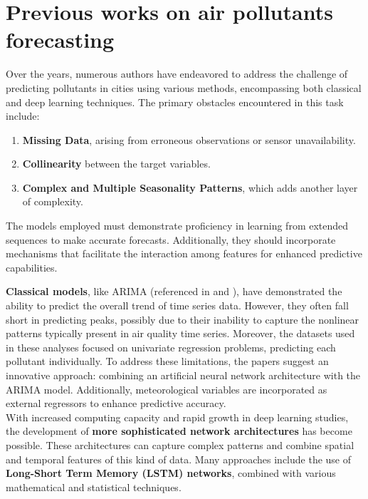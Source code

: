 \section{Previous works on air pollutants forecasting}
\label{cap1:sota}
Over the years, numerous authors have endeavored to address the challenge of predicting pollutants in cities using various methods, encompassing both classical and deep learning techniques. The primary obstacles encountered in this task include:

\begin{enumerate}
  \item \textbf{Missing Data}, arising from erroneous observations or sensor unavailability.
  \item \textbf{Collinearity} between the target variables.
  \item \textbf{Complex and Multiple Seasonality Patterns}, which adds another layer of complexity.
\end{enumerate}

The models employed must demonstrate proficiency in learning from extended sequences to make accurate forecasts. Additionally, they should incorporate mechanisms that facilitate the interaction among features for enhanced predictive capabilities.

\textbf{Classical models}, like ARIMA (referenced in \cite{DIAZROBLES20088331} and \cite{Jodar2013}), have demonstrated the ability to predict the overall trend of time series data. However, they often fall short in predicting peaks, possibly due to their inability to capture the nonlinear patterns typically present in air quality time series. Moreover, the datasets used in these analyses focused on univariate regression problems, predicting each pollutant individually. To address these limitations, the papers suggest an innovative approach: combining an artificial neural network architecture with the ARIMA model. Additionally, meteorological variables are incorporated as external regressors to enhance predictive accuracy.\\

With increased computing capacity and rapid growth in deep learning studies, the development of \textbf{more sophisticated network architectures} has become possible. These architectures can capture complex patterns and combine spatial and temporal features of this kind of data.
Many approaches include the use of \textbf{Long-Short Term Memory (LSTM) networks}, combined with various mathematical and statistical techniques.

